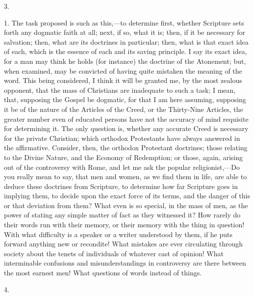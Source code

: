 3.

1. The task proposed is such as this,—to determine first, whether
Scripture sets forth any dogmatic faith at all; next, if so, what it
is; then, if it be necessary for salvation; then, what are its
doctrines in particular; then, what is that exact idea of each, which
is the essence of each and its saving principle. I say its exact idea,
for a man may think he holds (for instance) the doctrine of the
Atonement; but, when examined, may be convicted of having quite
mistaken the meaning of the word. This being considered, I think it
will be granted me, by the most zealous opponent, that the mass of
Christians are inadequate to such a task; I mean, that, supposing the
Gospel be dogmatic, for that I am here assuming, supposing it be of
the nature of the Articles of the Creed, or the Thirty-Nine Articles,
the greater number even of educated persons have not the accuracy of
mind requisite for determining it. The only question is, whether any
accurate Creed is necessary for the private Christian; which orthodox
Protestants have always answered in the affirmative. Consider, then,
the orthodox Protestant doctrines; those relating to the Divine
Nature, and the Economy of Redemption; or those, again, arising out of
the controversy with Rome, and let me ask the popular religionist,—Do
you really mean to say, that men and women, as we find them in life,
are able to deduce these doctrines from Scripture, to determine how
far Scripture goes in implying them, to decide upon the exact force of
its terms, and the danger of this or that deviation from them? What
even is so special, in the mass of men, as the power of stating any
simple matter of fact as they witnessed it? How rarely do their words
run with their memory, or their memory with the thing in question!
With what difficulty is a speaker or a writer understood by them, if
he puts forward anything new or recondite! What mistakes are ever
circulating through society about the tenets of individuals of
whatever cast of opinion! What interminable confusions and
misunderstandings in controversy are there between the most earnest
men! What questions of words instead of things.

4.

